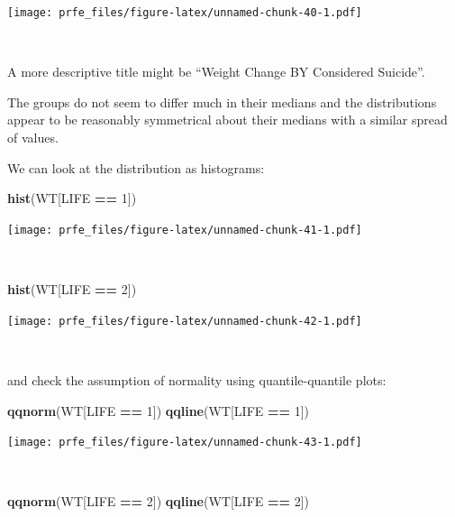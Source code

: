 \documentclass[12pt,a4paper]{book}
\newenvironment{Shaded}{\begin{snugshade}}{\end{snugshade}}
\newcommand{\KeywordTok}[1]{\textcolor[rgb]{0.13,0.29,0.53}{\textbf{#1}}}
\newcommand{\DecValTok}[1]{\textcolor[rgb]{0.00,0.00,0.81}{#1}}
\newcommand{\StringTok}[1]{\textcolor[rgb]{0.31,0.60,0.02}{#1}}
\newcommand{\OperatorTok}[1]{\textcolor[rgb]{0.81,0.36,0.00}{\textbf{#1}}}
\newcommand{\NormalTok}[1]{#1}
\theoremstyle{definition}
\theoremstyle{definition}
\theoremstyle{definition}
\theoremstyle{remark}
\begin{document}
\texttt{[image: prfe\_files/figure-latex/unnamed-chunk-40-1.pdf]}

~

A more descriptive title might be ``Weight Change BY Considered
Suicide''.

The groups do not seem to differ much in their medians and the
distributions appear to be reasonably symmetrical about their medians
with a similar spread of values.

We can look at the distribution as histograms:

\begin{Shaded}
\begin{Highlighting}[]
\KeywordTok{hist}\NormalTok{(WT[LIFE }\OperatorTok{==}\StringTok{ }\DecValTok{1}\NormalTok{])}
\end{Highlighting}
\end{Shaded}

\texttt{[image: prfe\_files/figure-latex/unnamed-chunk-41-1.pdf]}

~

\begin{Shaded}
\begin{Highlighting}[]
\KeywordTok{hist}\NormalTok{(WT[LIFE }\OperatorTok{==}\StringTok{ }\DecValTok{2}\NormalTok{])}
\end{Highlighting}
\end{Shaded}

\texttt{[image: prfe\_files/figure-latex/unnamed-chunk-42-1.pdf]}

~

and check the assumption of normality using quantile-quantile plots:

\begin{Shaded}
\begin{Highlighting}[]
\KeywordTok{qqnorm}\NormalTok{(WT[LIFE }\OperatorTok{==}\StringTok{ }\DecValTok{1}\NormalTok{])}
\KeywordTok{qqline}\NormalTok{(WT[LIFE }\OperatorTok{==}\StringTok{ }\DecValTok{1}\NormalTok{])}
\end{Highlighting}
\end{Shaded}

\texttt{[image: prfe\_files/figure-latex/unnamed-chunk-43-1.pdf]}

~

\begin{Shaded}
\begin{Highlighting}[]
\KeywordTok{qqnorm}\NormalTok{(WT[LIFE }\OperatorTok{==}\StringTok{ }\DecValTok{2}\NormalTok{])}
\KeywordTok{qqline}\NormalTok{(WT[LIFE }\OperatorTok{==}\StringTok{ }\DecValTok{2}\NormalTok{])}
\end{Highlighting}
\end{Shaded}
\end{document}
